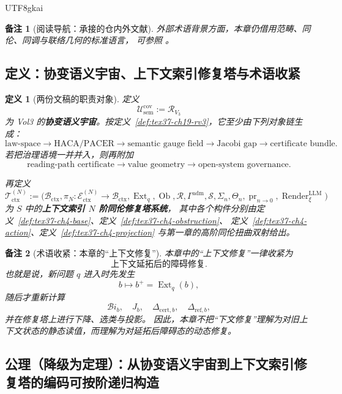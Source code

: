 \documentclass[12pt]{article}
\newtheorem{definition}{定义}[section]
\newtheorem{remark}{备注}[section]
\newcommand{\Render}{\operatorname{Render}}
\begin{document}
\begin{CJK*}{UTF8}{gkai}
\begin{remark}[阅读导航：承接的仓内外文献]
外部术语背景方面，本章仍借用范畴、同伦、同调与联络几何的标准语言，
可参照 \cite{MacLane1998Categories,Hatcher2002AT,Weibel1994HomologicalAlgebra,KobayashiNomizu1963Foundations}。
\end{remark}

\subsection{定义：协变语义宇宙、上下文索引修复塔与术语收紧}
\label{subsec:tex37-ch20-definitions}

\begin{definition}[两份文稿的职责对象]
\label{def:tex37-ch20-objects}
定义
\[
  \mathcal{U}_{\mathrm{sem}}^{\mathrm{cov}}
  :=
  \mathcal R_{V_3}
\]
为 Vol3 的\textbf{协变语义宇宙}。按定义~\ref{def:tex37-ch19-rv3}，它至少由下列对象链生成：
\[
  \text{law-space}
  \to
  \text{HACA/PACER}
  \to
  \text{semantic gauge field}
  \to
  \text{Jacobi gap}
  \to
  \text{certificate bundle}.
\]
若把治理语境一并并入，则再附加
\[
  \text{reading-path certificate}
  \to
  \text{value geometry}
  \to
  \text{open-system governance}.
\]

再定义
\[
  \mathcal{T}_{\mathrm{ctx}}^{(N)}
  :=
  \bigl(
    \mathcal{B}_{\mathrm{ctx}},
    \pi_N:\mathcal{E}_{\mathrm{ctx}}^{(N)}\to \mathcal{B}_{\mathrm{ctx}},
    \operatorname{Ext}_q,
    \operatorname{Ob},
    \mathcal R,
    \Gamma^{\mathrm{adm}},
    \mathcal S,
    \Sigma_n,
    \Theta_n,
    \operatorname{pr}_{n\to 0},
    \Render^{\mathrm{LLM}}_\xi
  \bigr)
\]
为 $S$ 中的\textbf{上下文索引 $N$ 阶同伦修复塔系统}，
其中各个构件分别由定义~\ref{def:tex37-ch4-base}、定义~\ref{def:tex37-ch4-obstruction}、
定义~\ref{def:tex37-ch4-action}、定义~\ref{def:tex37-ch4-projection} 与第一章的高阶同伦扭曲双射给出。
\end{definition}

\begin{remark}[术语收紧：本章的“上下文修复”]
本章中的“上下文修复”一律收紧为
\[
  \text{上下文延拓后的障碍修复}.
\]
也就是说，新问题 $q$ 进入时先发生
\[
  b\mapsto b^+=\operatorname{Ext}_q(b),
\]
随后才重新计算
\[
  \mathcal{B}\!i_b,\quad
  J_b,\quad
  \Delta_{\mathrm{cert},b},\quad
  \Delta_{\mathrm{ref},b},
\]
并在修复塔上进行下降、选类与投影。
因此，本章不把“下文修复”理解为对旧上下文状态的静态读值，而理解为对延拓后障碍态的动态修复。
\end{remark}

\subsection{公理（降级为定理）：从协变语义宇宙到上下文索引修复塔的编码可按阶递归构造}
\label{subsec:tex37-ch20-axiom}


\end{CJK*}
\end{document}
